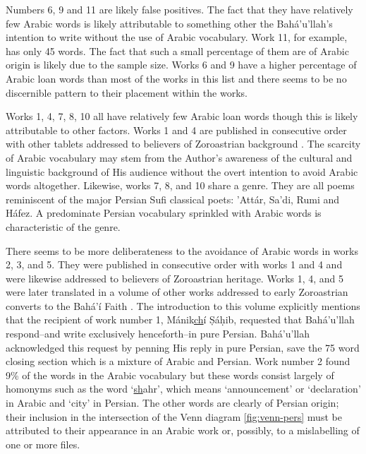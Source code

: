 \documentclass[12pt, oneside]{report}
\begin{document}
\par
Numbers 6, 9 and 11 are likely false positives.
The fact that they have relatively few Arabic words is likely attributable to something other the Bah\'{a}'u'llah's intention to write without the use of Arabic vocabulary.
Work 11, for example, has only 45 words.
The fact that such a small percentage of them are of Arabic origin is likely due to the sample size.
Works 6 and 9 have a higher percentage of Arabic loan words than most of the works in this list and there seems to be no discernible pattern to their placement within the works.
\par
Works 1, 4, 7, 8, 10 all have relatively few Arabic loan words though this is likely attributable to other factors.
Works 1 and 4 are published in consecutive order with other tablets addressed to believers of Zoroastrian background \cite{bahaullah_majmu`ih-i_1920}.
The scarcity of Arabic vocabulary may stem from the Author's awareness of the cultural and linguistic background of His audience without the overt intention to avoid Arabic words altogether.
Likewise, works 7, 8, and 10 share a genre.
They are all poems reminiscent of the major Persian Sufi classical poets: 'Att\'{a}r, Sa'di, Rumi and H\'{a}fez.
A predominate Persian vocabulary sprinkled with Arabic words is characteristic of the genre.
\par
There seems to be more deliberateness to the avoidance of Arabic words in works 2, 3, and 5.
They were published in consecutive order with works 1 and 4 and were likewise addressed to believers of Zoroastrian heritage.
Works 1, 4, and 5 were later translated in a volume of other works addressed to early Zoroastrian converts to the Bah\'{a}'\'{i} Faith \cite{bahaullah_tabernacle_2006}.
The introduction to this volume explicitly mentions that the recipient of work number 1, M\'{a}nik\underline{ch}\'{i} Ṣ\'{a}ḥib, requested that Bah\'{a}'u'llah respond–and write exclusively henceforth–in pure Persian.
Bah\'{a}'u'llah acknowledged this request by penning His reply in pure Persian, save the 75 word closing section which is a mixture of Arabic and Persian.
Work number 2 found 9\% of the words in the Arabic vocabulary but these words consist largely of homonyms such as the word `\underline{sh}ahr', which means `announcement' or `declaration' in Arabic and `city' in Persian.
The other words are clearly of Persian origin; their inclusion in the intersection of the Venn diagram \autoref{fig:venn-pers} must be attributed to their appearance in an Arabic work or, possibly, to a mislabelling of one or more files.
\end{document}
